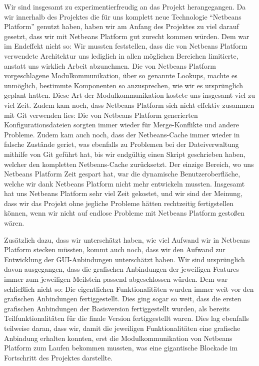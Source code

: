 Wir sind insgesamt zu experimentierfreudig an das Projekt herangegangen. Da wir innerhalb des Projektes die für uns komplett neue Technologie ``Netbeans Platform'' genutzt haben, haben wir am Anfang des Projektes zu viel darauf gesetzt, dass wir mit Netbeans Platform gut zurecht kommen würden. Dem war im Endeffekt nicht so: Wir mussten feststellen, dass die von Netbeans Platform verwendete Architektur uns lediglich in allen möglichen Bereichen limitierte, anstatt uns wirklich Arbeit abzunehmen. Die von Netbeans Platform vorgeschlagene Modulkommunikation, über so genannte Lookups, machte es unmöglich, bestimmte Komponenten so anzusprechen, wie wir es ursprünglich geplant hatten. Diese Art der Modulkommunikation kostete uns insgesamt viel zu viel Zeit. Zudem kam noch, dass Netbeans Platform sich nicht effektiv zusammen mit Git verwenden lies: Die von Netbeans Platform generierten Konfigurationsdateien sorgten immer wieder für Merge-Konflikte und andere Probleme. Zudem kam auch noch, dass der Netbeans-Cache immer wieder in falsche Zustände geriet, was ebenfalls zu Problemen bei der Dateiverwaltung mithilfe von Git geführt hat, bis wir endgültig einen Skript geschrieben haben, welcher den kompletten Netbeans-Cache zurücksetzt. Der einzige Bereich, wo uns Netbeans Platform Zeit gespart hat, war die dynamische Benutzeroberfläche, welche wir dank Netbeans Platform nicht mehr entwickeln mussten. Insgesamt hat uns Netbeans Platform sehr viel Zeit gekostet, und wir sind der Meinung, dass wir das Projekt ohne jegliche Probleme hätten rechtzeitig fertigstellen können, wenn wir nicht auf endlose Probleme mit Netbeans Platform gestoßen wären.

Zusätzlich dazu, dass wir unterschätzt haben, wie viel Aufwand wir in Netbeans Platform stecken müssten, kommt auch noch, dass wir den Aufwand zur Entwicklung der GUI-Anbindungen unterschätzt haben. Wir sind ursprünglich davon ausgegangen, dass die grafischen Anbindungen der jeweiligen Features immer zum jeweiligen Meilstein passend abgeschlossen würden. Dem war schließlich nicht so: Die eigentlichen Funktionalitäten wurden immer weit vor den grafischen Anbindungen fertiggestellt. Dies ging sogar so weit, dass die ersten grafischen Anbindungen der Basisversion fertiggestellt wurden, als bereits Teilfunktionalitäten für die finale Version fertiggestellt waren. Dies lag ebenfalls teilweise daran, dass wir, damit die jeweiligen Funktionalitäten eine grafische Anbindung erhalten konnten, erst die Modulkommunikation von Netbeans Platform zum Laufen bekommen mussten, was eine gigantische Blockade im Fortschritt des Projektes darstellte.

